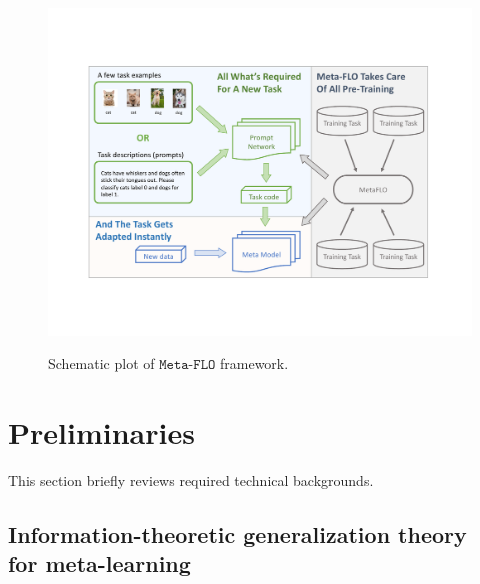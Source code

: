 \documentclass[nohyperref]{article}
\theoremstyle{plain}
\theoremstyle{definition}
\theoremstyle{remark}
\newcommand{\metaflo}{\texttt{Meta-FLO} }
\begin{document}
\begin{figure}[t!]
\begin{center}
{
\includegraphics[width=.9\textwidth]{figures/metaflo-demo}
}
\end{center}
\vspace{-1.5em}
\caption{Schematic plot of $\metaflo$ framework. \label{fig:metaflo}}
\vspace{-1.em}
\end{figure}


\section{Preliminaries}

This section briefly reviews required technical backgrounds. 

\subsection{Information-theoretic generalization theory \\\hspace{1.8em}for meta-learning}
\end{document}
